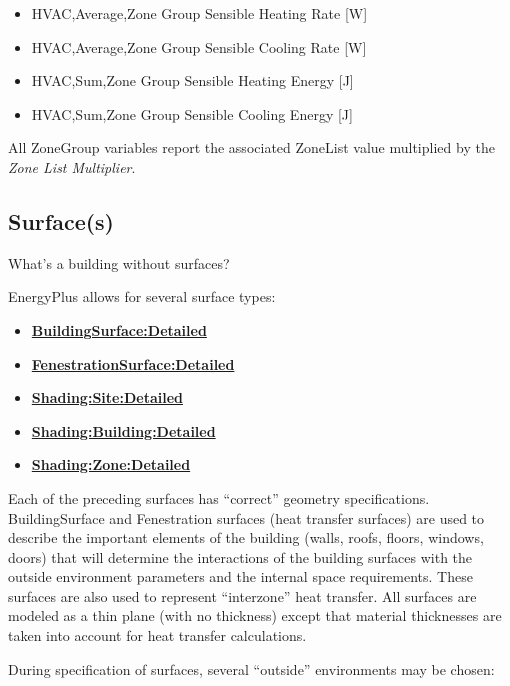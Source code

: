 \begin{itemize}
\item
  HVAC,Average,Zone Group Sensible Heating Rate {[}W{]}
\item
  HVAC,Average,Zone Group Sensible Cooling Rate {[}W{]}
\item
  HVAC,Sum,Zone Group Sensible Heating Energy {[}J{]}
\item
  HVAC,Sum,Zone Group Sensible Cooling Energy {[}J{]}
\end{itemize}

All ZoneGroup variables report the associated ZoneList value multiplied by the \emph{Zone List Multiplier}.

\subsection{Surface(s)}\label{surfaces}

What's a building without surfaces?

EnergyPlus allows for several surface types:

\begin{itemize}
\item
  \textbf{\hyperref[buildingsurfacedetailed]{BuildingSurface:Detailed}}
\item
  \textbf{\hyperref[fenestrationsurfacedetailed]{FenestrationSurface:Detailed}}
\item
  \textbf{\hyperref[shadingsitedetailed-shadingbuildingdetailed]{Shading:Site:Detailed}}
\item
  \textbf{\hyperref[shadingsitedetailed-shadingbuildingdetailed]{Shading:Building:Detailed}}
\item
  \textbf{\hyperref[shadingzonedetailed-000]{Shading:Zone:Detailed}}
\end{itemize}

Each of the preceding surfaces has ``correct'' geometry specifications. BuildingSurface and Fenestration surfaces (heat transfer surfaces) are used to describe the important elements of the building (walls, roofs, floors, windows, doors) that will determine the interactions of the building surfaces with the outside environment parameters and the internal space requirements. These surfaces are also used to represent ``interzone'' heat transfer. All surfaces are modeled as a thin plane (with no thickness) except that material thicknesses are taken into account for heat transfer calculations.

During specification of surfaces, several ``outside'' environments may be chosen:

